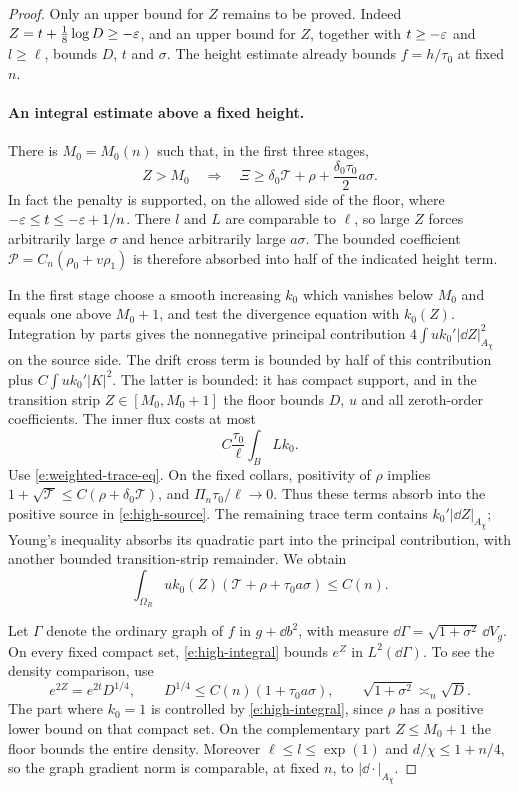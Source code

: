 \begin{proof}
Only an upper bound for $Z$ remains to be proved.  Indeed
$Z=t+\tfrac18\log D\ge-\varepsilon$, and an upper bound for $Z$, together
with $t\ge-\varepsilon$ and $l\ge\ell$, bounds $D$, $t$ and $\sigma$.
The height estimate already bounds $f=h/\tau_0$ at fixed $n$.

\paragraph{An integral estimate above a fixed height.}
There is $M_0=M_0(n)$ such that, in the first three stages,
\begin{equation}\label{e:high-source}
 Z>M_0\quad\Longrightarrow\quad
 \Xi\ge\delta_0\mathcal T+\rho+
                         \frac{\delta_0\tau_0}{2}a\sigma.
\end{equation}
In fact the penalty is supported, on the allowed side of the floor,
where $-\varepsilon\le t\le-\varepsilon+1/n$.  There $l$ and $L$ are
comparable to $\ell$, so large $Z$ forces arbitrarily large $\sigma$
and hence arbitrarily large $a\sigma$.  The bounded coefficient
$\mathcal P=C_n(\rho_0+v\rho_1)$ is therefore absorbed into half of
the indicated height term.

In the first stage choose a smooth increasing $k_0$ which vanishes
below $M_0$ and equals one above $M_0+1$, and test the divergence
equation with $k_0(Z)$.  Integration by parts gives the nonnegative
principal contribution
$4\int u k_0'|\dd Z|_{A_\chi}^2$ on the source side.  The drift cross
term is bounded by half of this contribution plus
$C\int u k_0'|K|^2$.  The latter is bounded: it has compact support,
and in the transition strip $Z\in[M_0,M_0+1]$ the floor bounds $D$, $u$
and all zeroth-order coefficients.
The inner flux costs at most
\[
 C\frac{\tau_0}{\ell}\int_B Lk_0.
\]
Use \eqref{e:weighted-trace-eq}.  On the fixed collars, positivity of
$\rho$ implies
$1+\sqrt{\mathcal T}\le C(\rho+\delta_0\mathcal T)$, and
$\Pi_n\tau_0/\ell\to0$.  Thus these terms absorb into the positive
source in \eqref{e:high-source}.  The remaining trace term contains
$k_0'|\dd Z|_{A_\chi}$; Young's inequality absorbs its quadratic part
into the principal contribution, with another bounded
transition-strip remainder.  We obtain
\begin{equation}\label{e:high-integral}
 \int_{\Omega_R}u k_0(Z)
          (\mathcal T+\rho+\tau_0a\sigma)\le C(n).
\end{equation}

Let $\Gamma$ denote the ordinary graph of $f$ in $g+\dd b^2$, with
measure $\dd\Gamma=\sqrt{1+\sigma^2}\,\dd V_g$.  On every fixed
compact set, \eqref{e:high-integral} bounds $e^Z$ in
$L^2(\dd\Gamma)$.  To see the density comparison, use
\[
 e^{2Z}=e^{2t}D^{1/4},\qquad
 D^{1/4}\le C(n)(1+\tau_0a\sigma),\qquad
 \sqrt{1+\sigma^2}\asymp_n\sqrt D.
\]
The part where $k_0=1$ is controlled by
\eqref{e:high-integral}, since $\rho$ has a positive lower bound on
that compact set.  On the complementary part $Z\le M_0+1$ the floor
bounds the entire density.  Moreover $\ell\le l\le\exp(1)$ and
$d/\chi\le1+n/4$, so the graph gradient norm is comparable, at fixed
$n$, to $|\dd\cdot|_{A_\chi}$.


\end{proof}
